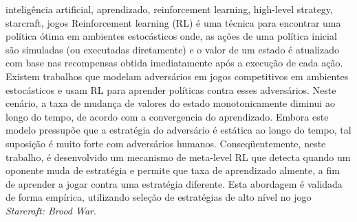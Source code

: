 \documentclass[english,twoside]{pucrs-ppgcc}
\begin{document}
\begin{resumo}{inteligência artificial, aprendizado, reinforcement learning, high-level strategy, starcraft, jogos}
Reinforcement learning (RL) é uma técnica para encontrar uma política ótima em ambientes estocásticos onde, as ações de uma política inicial são simuladas (ou executadas diretamente) e o valor de um estado é atualizado com base nas recompensas obtida imediatamente após a execução de cada ação.
Existem trabalhos que modelam adversários em jogos competitivos em ambientes estocásticos e usam RL para aprender políticas contra esses adversários.
Neste cenário, a taxa de mudança de valores do estado monotonicamente diminui ao longo do tempo, de acordo com a convergencia do aprendizado.
Embora este modelo pressupõe que a estratégia do adversário é estática ao longo do tempo, tal suposição é muito forte com adversários humanos.
Conseqüentemente, neste trabalho, é desenvolvido um mecanismo de meta-level RL que detecta quando um oponente muda de estratégia e permite que taxa de aprendizado almente, a fim de aprender a jogar contra uma estratégia diferente.
Esta abordagem é validada de forma empírica, utilizando seleção de estratégias de alto nível no jogo \textit{Starcraft: Brood War}.
\end{resumo}

\listoffigures
\listofalgorithms
\tableofcontents












%


\end{document}
